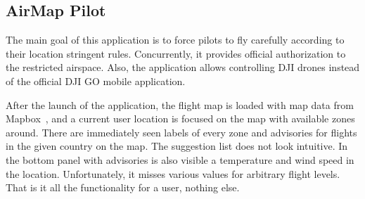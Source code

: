 \subsection{AirMap Pilot}\label{subsec:airmap-pilot}
The main goal of this application is to force pilots to fly carefully according to their location stringent rules.
Concurrently, it provides official authorization to the restricted airspace.
Also, the application allows controlling DJI drones instead of the official DJI GO mobile application.

After the launch of the application, the flight map is loaded with map data from Mapbox~\cite{mapBox}, and a current user location is focused on the map with available zones around.
There are immediately seen labels of every zone and advisories for flights in the given country on the map.
The suggestion list does not look intuitive.
In the bottom panel with advisories is also visible a temperature and wind speed in the location.
Unfortunately, it misses various values for arbitrary flight levels.
That is it all the functionality for a user, nothing else.


